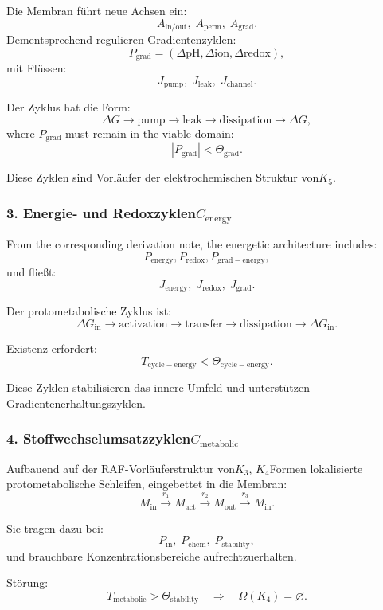 Die Membran führt neue Achsen ein:
\[
  A_{\mathrm{in/out}},\;
  A_{\mathrm{perm}},\;
  A_{\mathrm{grad}}.
\]
Dementsprechend regulieren Gradientenzyklen:
\[
  P_{\mathrm{grad}}=
    (\Delta \mathrm{pH}, \Delta \mathrm{ion}, \Delta \mathrm{redox}),
\]
mit Flüssen:
\[
  J_{\mathrm{pump}},\;
  J_{\mathrm{leak}},\;
  J_{\mathrm{channel}}.
\]

Der Zyklus hat die Form:
\[
  \Delta G \to \mathrm{pump} \to
  \mathrm{leak} \to \mathrm{dissipation} \to
  \Delta G,
\]
where $P_{\mathrm{grad}}$ must remain in the viable domain:
\[
  |P_{\mathrm{grad}}| < \Theta_{\mathrm{grad}}.
\]

Diese Zyklen sind Vorläufer der elektrochemischen Struktur von$K_5$.

\subsubsection{3. Energie- und Redoxzyklen$C_{\mathrm{energy}}$}

From the corresponding derivation note, the energetic architecture includes:
\[
  P_{\mathrm{energy}},
  P_{\mathrm{redox}},
  P_{\mathrm{grad-energy}},
\]
und fließt:
\[
  J_{\mathrm{energy}},\;
  J_{\mathrm{redox}},\;
  J_{\mathrm{grad}}.
\]

Der protometabolische Zyklus ist:
\[
  \Delta G_{\mathrm{in}} \to
  \mathrm{activation} \to
  \mathrm{transfer} \to
  \mathrm{dissipation} \to
  \Delta G_{\mathrm{in}}.
\]

Existenz erfordert:
\[
  T_{\mathrm{cycle-energy}} < \Theta_{\mathrm{cycle-energy}}.
\]

Diese Zyklen stabilisieren das innere Umfeld und unterstützen
Gradientenerhaltungszyklen.

\subsubsection{4. Stoffwechselumsatzzyklen$C_{\mathrm{metabolic}}$}

Aufbauend auf der RAF-Vorläuferstruktur von$K_3$, $K_4$Formen
lokalisierte protometabolische Schleifen, eingebettet in die Membran:
\[
  M_{\mathrm{in}} \xrightarrow{r_1}
  M_{\mathrm{act}} \xrightarrow{r_2}
  M_{\mathrm{out}} \xrightarrow{r_3}
  M_{\mathrm{in}}.
\]

Sie tragen dazu bei:
\[
  P_{\mathrm{in}},\; P_{\mathrm{chem}},\; P_{\mathrm{stability}},
\]
und brauchbare Konzentrationsbereiche aufrechtzuerhalten.

Störung:
\[
  T_{\mathrm{metabolic}}>\Theta_{\mathrm{stability}}
\quad\Rightarrow\quad
  \Omega(K_4)=\varnothing.
\]

